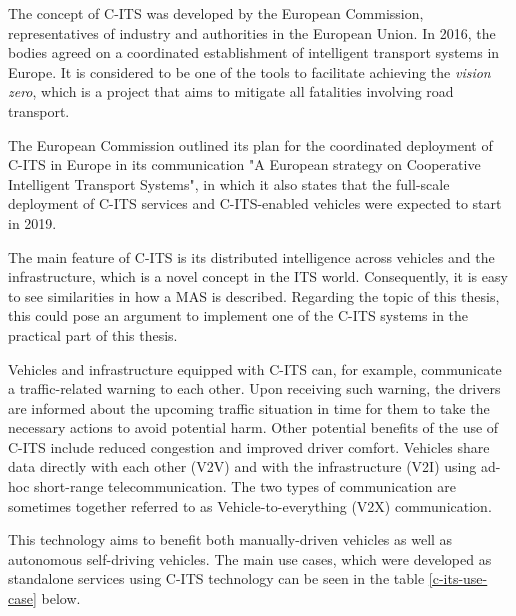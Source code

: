 \documentclass[0main.tex]{subfiles}
\begin{document}
The concept of C-ITS was developed by the European Commission, representatives of industry and 
authorities in the European Union. In 2016, the bodies agreed on a coordinated establishment of intelligent
transport systems in Europe. It is considered to be one of the tools to facilitate achieving 
the \emph{vision zero}, which is a project that aims to mitigate all fatalities involving road 
transport.

The European Commission outlined its plan for the coordinated deployment of C-ITS in Europe in
its communication "A European strategy on Cooperative Intelligent Transport Systems", in which
it also states that the full-scale deployment of C-ITS services and C-ITS-enabled vehicles were
expected to start in 2019.

The main feature of C-ITS is its distributed intelligence across vehicles and the infrastructure, 
which is a novel concept in the ITS world. Consequently, it is easy to see similarities in how a
MAS is described. Regarding the topic of this thesis, this could pose an argument to
implement one of the C-ITS systems in the practical part of this thesis.

Vehicles and infrastructure equipped with C-ITS can, for example, communicate a traffic-related warning to each
other. Upon receiving such warning, the drivers are informed about the upcoming traffic situation in time for
them to take the necessary actions to avoid potential harm. Other potential benefits
of the use of C-ITS include reduced congestion and improved driver comfort. Vehicles 
share data directly with each other (V2V) and with the infrastructure (V2I) using ad-hoc
short-range telecommunication. The two types of communication are sometimes together referred 
to as Vehicle-to-everything (V2X) communication.

This technology aims to benefit both manually-driven vehicles 
as well as autonomous self-driving vehicles. The main use cases, which were developed as
standalone services using C-ITS technology can be seen in the table \ref{c-its-use-case}
below.
\end{document}
